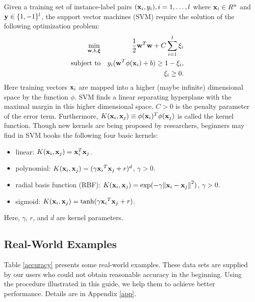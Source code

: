 \documentclass[12pt]{article}
\def\bw{{\bf w}}
\def\bx{{\bf x}}
\def\by{{\bf y}}
\newcommand{\bxi}{{\boldsymbol{\xi}}}
\begin{document}
Given a training set of
instance-label pairs  $(\bx_i,y_i), i = 1, \ldots, l$
where $\bx_i \in R^n$ and $\by \in
\{1, -1 \}^l$,
the support vector machines (SVM)
\citep{BB92a,CC95a} require
the solution of the following optimization
problem:
 \begin{eqnarray}
\min_{\bw,b,\bxi} && \frac{1}{2}\bw^T \bw + C \sum_{i=1}^l \xi_i
\nonumber \\
\mbox{subject to}&& y_i(\bw^T \phi(\bx_i) + b) \geq 1 - \xi_i,\label{svml1}\\
&& \xi_i \geq 0. \nonumber
\end{eqnarray}
Here training vectors $\bx_i$ are mapped into a higher (maybe
infinite) dimensional space by the function $\phi$.  SVM finds a
linear separating hyperplane with the maximal margin in this higher
dimensional space.  $C>0$ is the penalty parameter of the error
term. Furthermore, $K(\bx_i, \bx_j) \equiv \phi(\bx_i)^T\phi(\bx_j)$
is called the kernel function.  Though new kernels are being proposed
by researchers, beginners may find in SVM books the following four
basic kernels:
\begin{itemize}
\item linear: $K(\bx_i, \bx_j) = \bx_i ^T \bx_j$.
\item polynomial: $K(\bx_i, \bx_j) = (\gamma {\bx_i}^T \bx_j + r)^d$, $\gamma > 0$.
\item radial basis function (RBF): $K(\bx_i, \bx_j) = 
\exp(-\gamma{\|\bx_i-\bx_j\|}^2)$, $\gamma > 0$.
\item sigmoid: $K(\bx_i, \bx_j) = \tanh(\gamma {\bx_i}^T \bx_j + r)$.
\end{itemize}
Here, $\gamma$, $r$, and $d$ are kernel parameters.

\subsection{Real-World Examples}

Table \ref{accuracy} presents some real-world examples. These data
sets are supplied by our users who could not obtain reasonable
accuracy in the beginning. Using the procedure illustrated in this
guide, we help them to achieve better performance. Details are in
Appendix \ref{app}.
\end{document}
